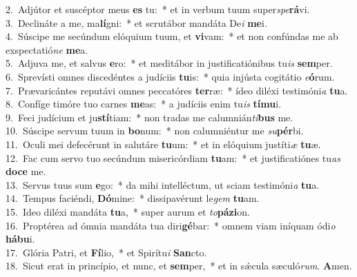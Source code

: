 {2.~}Adjútor et suscéptor meus \textbf{es} tu:~* et in verbum tuum super\textit{spe}\textbf{rá}vi.\\
{3.~}Declináte a me, ma\textbf{lí}gni:~* et scrutábor mandáta De\textit{i} \textbf{me}i.\\
{4.~}Súscipe me secúndum elóquium tuum, et \textbf{vi}vam:~* et non confúndas me ab exspectatió\textit{ne} \textbf{me}a.\\
{5.~}Adjuva me, et salvus \textbf{e}ro:~* et meditábor in justificatiónibus tu\textit{is} \textbf{sem}per.\\
{6.~}Sprevísti omnes discedéntes a judíciis \textbf{tu}is:~* quia injústa cogitátio \textit{e}\textbf{ó}rum.\\
{7.~}Prævaricántes reputávi omnes peccatóres \textbf{ter}ræ:~* ídeo diléxi testimóni\textit{a} \textbf{tu}a.\\
{8.~}Confíge timóre tuo carnes \textbf{me}as:~* a judíciis enim tu\textit{is} \textbf{tí}\textbf{mu}i.\\
{9.~}Feci judícium et ju\textbf{stí}tiam:~* non tradas me calumnián\textit{ti}\textbf{bus} me.\\
{10.~}Súscipe servum tuum in \textbf{bo}num:~* non calumniéntur me \textit{su}\textbf{pér}bi.\\
{11.~}Oculi mei defecérunt in salutáre \textbf{tu}um:~* et in elóquium justíti\textit{æ} \textbf{tu}æ.\\
{12.~}Fac cum servo tuo secúndum misericórdiam \textbf{tu}am:~* et justificatiónes tu\textit{as} \textbf{do}\textbf{ce} me.\\
{13.~}Servus tuus sum \textbf{e}go:~* da mihi intelléctum, ut sciam testimóni\textit{a} \textbf{tu}a.\\
{14.~}Tempus faciéndi, \textbf{Dó}mine:~* dissipavérunt le\textit{gem} \textbf{tu}am.\\
{15.~}Ideo diléxi mandáta \textbf{tu}a,~* super aurum et \textit{to}\textbf{pá}\textbf{zi}on.\\
{16.~}Proptérea ad ómnia mandáta tua diri\textbf{gé}bar:~* omnem viam iníquam ódi\textit{o} \textbf{há}\textbf{bu}i.\\
{17.~}Glória Patri, et \textbf{Fí}lio,~* et Spirítu\textit{i} \textbf{San}cto.\\
{18.~}Sicut erat in princípio, et nunc, et \textbf{sem}per,~* et in sǽcula sæculó\textit{rum}. \textbf{A}men.\\
